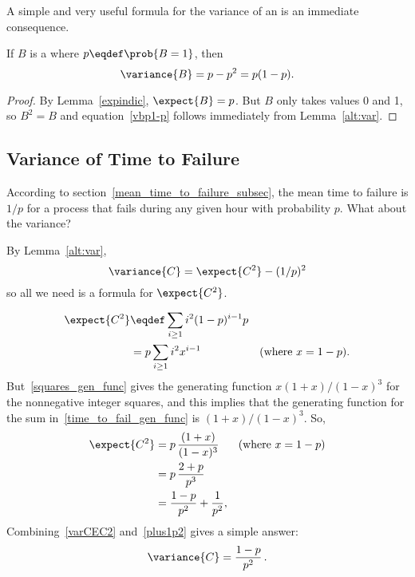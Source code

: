 A simple and very useful formula for the variance of an  is an immediate consequence.
\begin{corollary}\label{bernoulli-variance}
If $B$ is a  where $p\eqdef
\prob{B=1}$, then
\begin{equation}\label{vbp1-p}
\variance{B} = p-p^2 = p(1-p).
\end{equation}
\begin{proof}
  By Lemma~\ref{expindic}, $\expect{B}= p$.  But $B$ only takes
  values 0 and 1, so $B^2 = B$ and equation~\eqref{vbp1-p} follows
  immediately from Lemma~\ref{alt:var}.
\end{proof}

\end{corollary}

\subsection{Variance of Time to Failure}
According to section~\ref{mean_time_to_failure_subsec}, the mean time
to failure is $1/p$ for a process that fails during any given hour
with probability $p$.  What about the variance?

By Lemma~\ref{alt:var},
\begin{equation}\label{varCEC2}
\variance{C} = \expect{C^2} - (1/p)^2
\end{equation}
so all we need is a formula for $\expect{C^2}$.

\iffalse

\begin{align}
\expect{C^2}
   & \eqdef \sum_{i\geq 1} i^2(1-p)^{i-1}p \notag\\ %
   & = p\sum_{i\geq 1} i^2x^{i-1} & \text{(where $x=1-p$)}\label{time_to_fail_gen_func}.
\end{align}
But~\eqref{squares_gen_func} gives the generating function
$x(1+x)/(1-x)^3$ for the nonnegative integer squares, and this implies that
the generating function for the sum in~\eqref{time_to_fail_gen_func} is
$(1+x)/(1-x)^3$.  So,
\begin{align}
\expect{C^2} & = p\, \frac{(1+x)}{(1-x)^3} & \text{(where $x=1-p$)}\notag\\
             & = p\, \frac{2+p}{p^3}\notag\\
             & = \frac{1-p}{p^2} + \frac{1}{p^2}\label{plus1p2},
\end{align}
Combining~\eqref{varCEC2} and~\eqref{plus1p2} gives a simple answer:
\begin{equation}\label{var_time_to_fail}
\variance{C} = \frac{1-p}{p^2} \,.
\end{equation}

